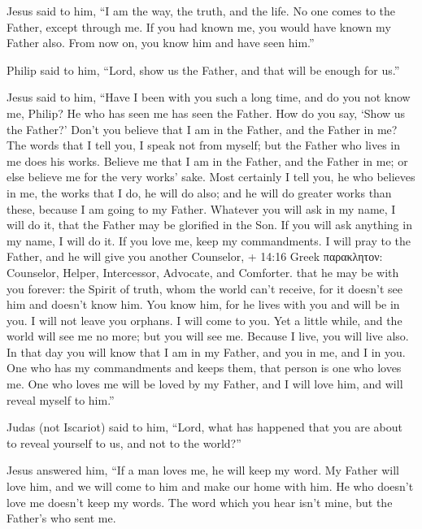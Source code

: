  Jesus said to him, ``I am the way, the truth, and the life.
No one comes to the Father, except through me.  If you had
known me, you would have known my Father also. From now on, you know him
and have seen him.''

 Philip said to him, ``Lord, show us the Father, and that
will be enough for us.''

 Jesus said to him, ``Have I been with you such a long time,
and do you not know me, Philip? He who has seen me has seen the Father.
How do you say, `Show us the Father?'  Don't you believe
that I am in the Father, and the Father in me? The words that I tell
you, I speak not from myself; but the Father who lives in me does his
works.  Believe me that I am in the Father, and the Father
in me; or else believe me for the very works' sake.  Most
certainly I tell you, he who believes in me, the works that I do, he
will do also; and he will do greater works than these, because I am
going to my Father.  Whatever you will ask in my name, I
will do it, that the Father may be glorified in the Son. 
If you will ask anything in my name, I will do it.  If you
love me, keep my commandments.  I will pray to the Father,
and he will give you another Counselor, + 14:16 Greek παρακλητον:
Counselor, Helper, Intercessor, Advocate, and Comforter. that he may be
with you forever:  the Spirit of truth, whom the world
can't receive, for it doesn't see him and doesn't know him. You know
him, for he lives with you and will be in you.  I will not
leave you orphans. I will come to you.  Yet a little while,
and the world will see me no more; but you will see me. Because I live,
you will live also.  In that day you will know that I am in
my Father, and you in me, and I in you.  One who has my
commandments and keeps them, that person is one who loves me. One who
loves me will be loved by my Father, and I will love him, and will
reveal myself to him.''

 Judas (not Iscariot) said to him, ``Lord, what has
happened that you are about to reveal yourself to us, and not to the
world?''

 Jesus answered him, ``If a man loves me, he will keep my
word. My Father will love him, and we will come to him and make our home
with him.  He who doesn't love me doesn't keep my words.
The word which you hear isn't mine, but the Father's who sent me.

